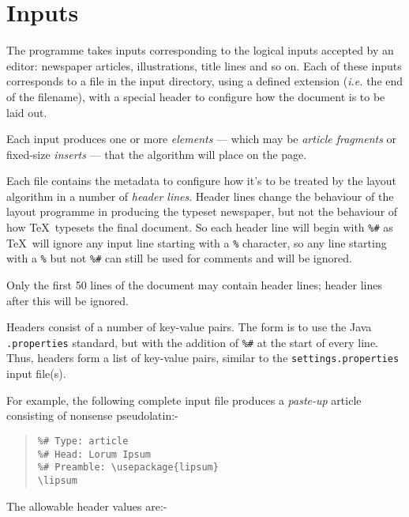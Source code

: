 \documentclass[a4paper,DIV=11]{scrartcl}
\begin{document}
\section*{Inputs}

The programme takes inputs corresponding to the logical inputs
accepted by an editor: newspaper articles, illustrations, title lines
and so on. Each of these inputs corresponds to a file in the input
directory, using a defined extension (\textit{i.e.} the end of the
filename), with a special header to configure
how the document is to be laid out.

Each input produces one or more \textit{elements} --- which may be
\textit{article fragments} or fixed-size \textit{inserts} --- that the
algorithm will place on the page.

Each file contains the metadata to configure how it's to be treated by
the layout algorithm in a number of \textit{header lines}. Header
lines change the behaviour of the layout programme in producing the
typeset newspaper, but not the behaviour of how \TeX\ typesets the
final document. So each header line will begin with \verb!%#! as
\TeX\ will ignore any input line starting with a \verb!%! character,
so any line starting with a \verb!%! but not \verb!%#! can still be
used for comments and will be ignored.

Only the first 50 lines of the document may contain header lines;
header lines after this will be ignored.

Headers consist of a number of key-value pairs. The form is to use the
Java \verb|.properties| standard, but with the addition of \verb!%#!
at the start of every line. Thus, headers form a list of key-value
pairs, similar to the \verb!settings.properties! input file(s).

For example, the following complete input file produces a \textit{paste-up} article
consisting of nonsense pseudolatin:-

\begin{quote}
\begin{verbatim}
%# Type: article
%# Head: Lorum Ipsum
%# Preamble: \usepackage{lipsum}
\lipsum
\end{verbatim}
\end{quote}

The allowable header values are:-\nopagebreak
\end{document}
